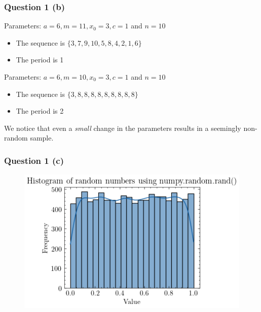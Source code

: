 \documentclass[compress,12pt]{beamer}
\begin{document}
\begin{frame}
      \frametitle{Question 1 (b)}

      Parameters: $a = 6, m = 11, x_0 = 3, c = 1$ and $n=10$
      \begin{itemize}
            \item The sequence is $\{3, 7, 9, 10, 5, 8, 4, 2, 1, 6\}$
            \item The period is 1
      \end{itemize}

      Parameters: $a = 6, m = 10, x_0 = 3, c = 1$ and $n=10$
      \begin{itemize}
            \item The sequence is $\{3, 8, 8, 8, 8, 8, 8, 8, 8, 8\}$
            \item The period is 2
      \end{itemize}
    \begin{tcolorbox}
    We notice that even a \emph{small} change in the parameters results in a seemingly non-random sample.
      \end{tcolorbox}
\end{frame}

\begin{frame}
      \frametitle{Question 1 (c)}
      \begin{figure}
            \centering
            \includegraphics[scale=0.7]{imgs/1d.png}
      \end{figure}
\end{frame}
\end{document}
